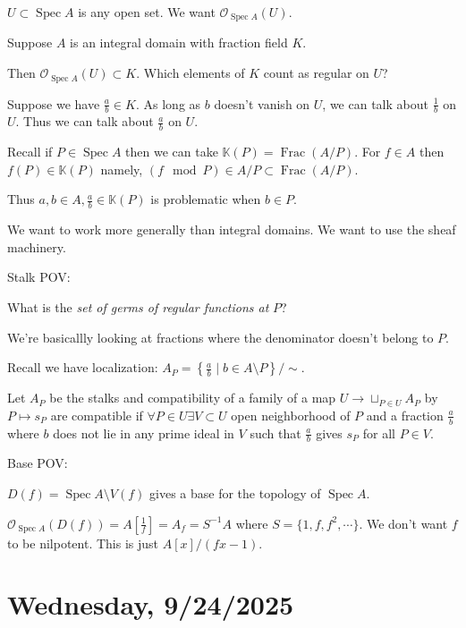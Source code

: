 \documentclass{article}
\theoremstyle{definition}
\begin{document}
    \(U \subset \operatorname{Spec} A\) is any open set. We want \(\mathcal{O}_{\operatorname{Spec} A}(U)\).

    Suppose \(A\) is an integral domain with fraction field \(K\).

    Then \(\mathcal{O}_{\operatorname{Spec} A}(U) \subset K\). Which elements of \(K\) count as regular on \(U\)?

    Suppose we have \(\frac{a}{b}\in K\). As long as \(b\) doesn't vanish on \(U\), we can talk about \(\frac{1}{b}\) on \(U\). Thus we can talk about \(\frac{a}{b}\) on \(U\).

    Recall if \(P\in \operatorname{Spec} A\) then we can take \(\mathbb{K} (P) = \operatorname{Frac}(A / P)\). For \(f\in A\) then \(f(P) \in \mathbb{K}(P)\) namely, \((f \mod P) \in A / P \subset \operatorname{Frac} (A / P)\).
    
    Thus \(a,b\in A, \frac{a}{b}\in \mathbb{K} (P)\) is problematic when \(b\in P\).
    
    We want to work more generally than integral domains. We want to use the sheaf machinery.

    Stalk POV:

    What is the \textit{set of germs of regular functions at} \(P\)?

    We're basicallly looking at fractions where the denominator doesn't belong to \(P\).

    Recall we have localization: \(A_P = \left\{ \frac{a}{b} \mid b \in A \setminus P \right\} / \sim\).

    Let \(A_P\) be the stalks and compatibility of a family of a map \(U \to \sqcup_{P\in U} A_P\) by \(P \mapsto s_P\) are compatible if \(\forall P\in U \exists V \subset U\) open neighborhood of \(P\) and a fraction \(\frac{a}{b}\) where \(b\) does not lie in any prime ideal in \(V\) such that \(\frac{a}{b}\) gives \(s_P\) for all \(P\in V\).

    Base POV:

    \(D(f) = \operatorname{Spec} A \setminus V(f)\) gives a base for the topology of \(\operatorname{Spec} A\).

    \(\mathcal{O}_{\operatorname{Spec} A}(D(f)) = A \left[ \frac{1}{f} \right] = A_f = S ^{-1} A \) where \(S = \{ 1, f, f^2, \cdots \}\). We don't want \(f\) to be nilpotent. This is just \(A[x] / (fx - 1)\).


    \section*{Wednesday, 9/24/2025}
    
\end{document}
